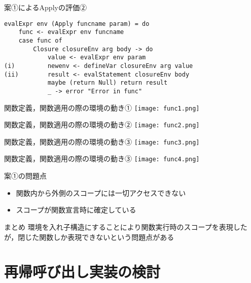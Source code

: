 \documentclass[uplatex,dvipdfmx,ja=standard]{beamer}
\begin{document}
\begin{frame}[fragile]{案①によるApplyの評価②}

    \begin{verbatim}
evalExpr env (Apply funcname param) = do
    func <- evalExpr env funcname
    case func of 
        Closure closureEnv arg body -> do
            value <- evalExpr env param  
(i)         newenv <- defineVar closureEnv arg value
(ii)        result <- evalStatement closureEnv body 
            maybe (return Null) return result        
            _ -> error "Error in func"
    \end{verbatim}
\end{frame}


\begin{frame}{関数定義，関数適用の際の環境の動き①}
    \centering 
    \texttt{[image: func1.png]}
\end{frame}

\begin{frame}{関数定義，関数適用の際の環境の動き②}
    \centering 
    \texttt{[image: func2.png]}
\end{frame}

\begin{frame}{関数定義，関数適用の際の環境の動き③}
    \centering 
    \texttt{[image: func3.png]}
\end{frame}


\begin{frame}{関数定義，関数適用の際の環境の動き③}
    \centering 
    \texttt{[image: func4.png]}
\end{frame}

\begin{frame}{案①の問題点}
    \begin{itemize}
        \item 関数内から外側のスコープには一切アクセスできない
        \item スコープが関数宣言時に確定している
    \end{itemize}
\end{frame}

\begin{frame}{まとめ}
環境を入れ子構造にすることにより関数実行時のスコープを表現したが，閉じた関数しか表現できないという問題点がある
\end{frame}

\section{再帰呼び出し実装の検討}
\end{document}
